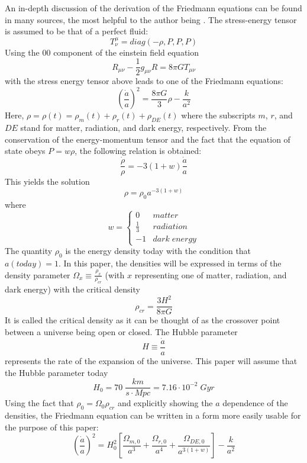 \documentclass[aps,reprint,prl,floatfix]{revtex4-1}
\begin{document}
An in-depth discussion of the derivation of the Friedmann equations can be found in many sources, the most helpful to the author being \cite{carroll}.  The stress-energy tensor is assumed to be that of a perfect fluid:
$$T^{\mu}_{\nu}=diag(-\rho,P,P,P)$$
Using the $00$ component of the einstein field equation
$$R_{\mu\nu}-\frac{1}{2}g_{\mu\nu}R=8\pi GT_{\mu\nu} $$
with the stress energy tensor above leads to one of the Friedmann equations:
\begin{equation}
\left(\frac{\dot{a}}{a}\right)^2=\frac{8\pi G}{3}\rho-\frac{k}{a^2}
\end{equation}
Here, $\rho=\rho(t)=\rho_{m}(t)+\rho_{r}(t)+\rho_{DE}(t)$
where the subscripts $m$, $r$, and $DE$ stand for matter, radiation, and dark energy, respectively.  From the conservation of the energy-momentum tensor and the fact that the equation of state obeys $P=w\rho$, the following relation is obtained:
$$\frac{ \dot{\rho} }{\rho}=-3(1+w)\frac{ \dot{a} }{a}$$
This yields the solution
\begin{equation}
\rho=\rho_0a^{-3(1+w)}
\end{equation}
where
\[w = \left\{
  \begin{array}{lr}
    0 & matter\\
    \frac{1}{3} & radiation\\
    -1 & dark\;energy
  \end{array}
\right.
\]
The quantity $\rho_0$ is the energy density today with the condition that $a(today)=1$.  In this paper, the densities will be expressed in terms of the density parameter $\Omega_x \equiv \frac{ \rho_{x} }{\rho_{cr}}$ (with $x$ representing one of matter, radiation, and dark energy) with the critical density
$$\rho_{cr}=\frac{3H^2}{8\pi G}$$
It is called the critical density as it can be thought of as the crossover point between a universe being open or closed.  The Hubble parameter
\begin{equation} \label{eq:hubble}
H\equiv \frac{ \dot{a} }{a}
\end{equation}
represents the rate of the expansion of the universe.  This paper will assume that the Hubble parameter today
$$H_0=70\;\frac{km}{s\cdot Mpc}=7.16\cdot10^{-2}\;Gyr$$
Using the fact that $\rho_0=\Omega_0 \rho_{cr}$ and explicitly showing the $a$ dependence of the densities, the Friedmann equation can be written in a form more easily usable for the purpose of this paper:
\begin{equation} \label{eq:friedmann}
\left(\frac{\dot{a}}{a}\right)^2=H_0^2\left[ \frac{\Omega_{m,0}}{a^3}+\frac{\Omega_{r,0}}{a^4}+\frac{\Omega_{DE,0}}{a^{3(1+w)}} \right] -\frac{k}{a^2}
\end{equation}
\end{document}
